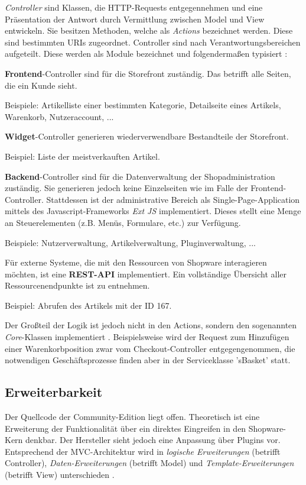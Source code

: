 \documentclass[11pt, a4paper, titlepage, listof=totoc, bibliography=totoc, index=totoc, twoside, openright, headings=normal]{scrreprt}
\begin{document}
\emph{Controller} sind Klassen, die HTTP-Requests entgegennehmen und eine Präsentation der Antwort durch Vermittlung zwischen Model und View entwickeln. Sie besitzen Methoden, welche als \emph{Actions} bezeichnet werden. Diese sind  bestimmten URIs zugeordnet. Controller sind nach Verantwortungsbereichen aufgeteilt. Diese werden als Module bezeichnet und folgendermaßen typisiert \citep{shopware4Docs}:
\begin{compactitem}
\item \textbf{Frontend}-Controller sind für die Storefront zuständig. Das betrifft alle Seiten, die ein Kunde sieht.\vspace{0.3em}

Beispiele: Artikelliste einer bestimmten Kategorie, Detailseite eines Artikels, Warenkorb, Nutzeraccount, ...
\item \textbf{Widget}-Controller generieren wiederverwendbare Bestandteile der Storefront.\vspace{0.3em}

Beispiel: Liste der meistverkauften Artikel.
\item \textbf{Backend}-Controller sind für die Datenverwaltung der Shopadministration zuständig. Sie generieren jedoch keine Einzelseiten wie im Falle der Frontend-Controller. Stattdessen ist der administrative Bereich als Single-Page-Application mittels des Javascript-Frameworks \emph{Ext JS} implementiert. Dieses stellt eine Menge an Steuerelementen (z.B. Menüs, Formulare, etc.) zur Verfügung.\vspace{0.3em}

Beispiele: Nutzerverwaltung, Artikelverwaltung, Pluginverwaltung, ...
\item Für externe Systeme, die mit den Ressourcen von Shopware interagieren möchten, ist eine \textbf{REST-API} implementiert. Ein vollständige Übersicht aller Ressourcenendpunkte ist \citet{shopwareRestApiEndpunkte} zu entnehmen.\vspace{0.3em}

Beispiel: Abrufen des Artikels mit der ID 167.
\end{compactitem}

Der Großteil der Logik ist jedoch nicht in den Actions, sondern den sogenannten \emph{Core}-Klassen implementiert \citep{shopware4Docs}. Beispielsweise wird der Request zum Hinzufügen einer Warenkorbposition zwar vom Checkout-Controller entgegengenommen, die notwendigen Geschäftsprozesse finden aber in der Serviceklasse 'sBasket' statt.

\subsection{Erweiterbarkeit}
\label{shopwareErweiterbarkeit}
Der Quellcode der Community-Edition liegt offen. Theoretisch ist eine Erweiterung der Funktionalität über ein direktes Eingreifen in den Shopware-Kern denkbar. Der Hersteller sieht jedoch eine Anpassung über Plugins vor. Entsprechend der \ac{MVC}-Architektur wird in \emph{logische Erweiterungen} (betrifft Controller), \emph{Daten-Erweiterungen} (betrifft Model) und \emph{Template-Erweiterungen} (betrifft View) unterschieden \citep{shopware5Docs}.
\end{document}
